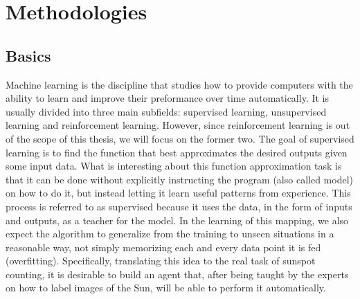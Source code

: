 \chapter{Methodologies}
\label{capitolo4}
\thispagestyle{empty}

\section{Basics}
\noindent Machine learning is the discipline that studies how to provide computers with the ability to learn and improve their preformance over time automatically. It is usually divided into three main subfields: supervised learning, unsupervised learning and reinforcement learning. However, since reinforcement learning is out of the scope of this thesis, we will focus on the former two.
\bigbreak
\noindent The goal of supervised learning is to find the function that best approximates the desired outputs given some input data. What is interesting about this function approximation task is that it can be done without explicitly instructing the program (also called model) on how to do it, but instead letting it learn useful patterns from experience. This process is referred to as supervised because it uses the data, in the form of inputs and outputs, as a teacher for the model. In the learning of this mapping, we also expect the algorithm to generalize from the training to unseen situations in a reasonable way, not simply memorizing each and every data point it is fed (overfitting). Specifically, translating this idea to the real task of sunspot counting, it is desirable to build an agent that, after being taught by the experts on how to label images of the Sun, will be able to perform it automatically.
